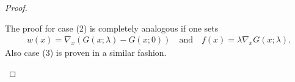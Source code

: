 \begin{proof}
\begin{enumerate}[(a)]
    The proof for case (2) is completely analogous if one sets 
      \begin{align*}
        w(x) = \nabla_x (G(x; \lambda) - G(x; 0))\quad\text{and}\quad f(x) = \lambda \nabla_x G(x; \lambda).
      \end{align*}
    Also case (3) is proven in a similar fashion. 
%


\end{enumerate}
\end{proof}
